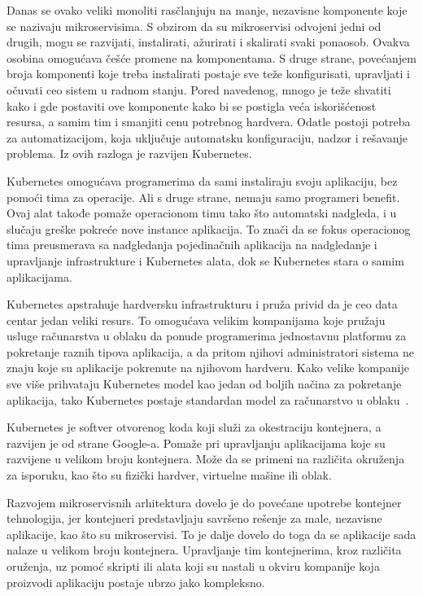 Danas se ovako veliki monoliti rasčlanjuju na manje, nezavisne komponente koje se nazivaju mikroservisima. S obzirom
da su mikroservisi odvojeni jedni od drugih, mogu se razvijati, instalirati, ažurirati i skalirati svaki ponaosob.
Ovakva osobina omogućava češće promene na komponentama. S druge strane, povećanjem broja komponenti koje treba 
instalirati postaje sve teže konfigurisati, upravljati i očuvati ceo sistem u radnom stanju. Pored navedenog, mnogo 
je teže shvatiti kako i gde postaviti ove komponente kako bi se postigla veća iskorišćenost resursa, a samim tim i 
smanjiti cenu potrebnog hardvera. Odatle postoji potreba za automatizacijom, koja uključuje automatsku konfiguraciju,
nadzor  i rešavanje problema. Iz ovih razloga je razvijen Kubernetes.

Kubernetes omogućava programerima da sami instaliraju svoju aplikaciju, bez pomoći tima za operacije. Ali s druge 
strane, nemaju samo programeri benefit. Ovaj alat takođe pomaže operacionom timu tako što automatski nadgleda, 
i u slučaju greške pokreće nove instance aplikacija. To znači da se fokus operacionog tima preusmerava sa nadgledanja
pojedinačnih aplikacija na nadgledanje i upravljanje infrastrukture i Kubernetes alata, dok se Kubernetes stara o samim
aplikacijama.

Kubernetes apstrahuje hardversku infrastrukturu i pruža privid da je ceo data centar jedan veliki resurs. To omogućava
velikim kompanijama koje pružaju usluge računarstva u oblaku da ponude programerima jednostavnu platformu za pokretanje
raznih tipova aplikacija, a da pritom njihovi administratori sistema ne znaju koje su aplikacije pokrenute na njihovom
hardveru. Kako velike kompanije sve više prihvataju Kubernetes model kao jedan od boljih načina za pokretanje aplikacija,
tako Kubernetes postaje standardan model za računarstvo u oblaku~\cite{KIA}.

Kubernetes je softver otvorenog koda koji služi za okestraciju kontejnera, a razvijen je od 
strane Google-a. Pomaže pri upravljanju aplikacijama koje su razvijene u velikom broju 
kontejnera. Može da se primeni na različita okruženja za isporuku, kao što su fizički 
hardver, virtuelne mašine ili oblak.

Razvojem mikroservisnih arhitektura dovelo je do povećane upotrebe kontejner tehnologija, jer 
kontejneri predstavljaju savršeno rešenje za male, nezavisne aplikacije, kao što su mikroservisi. 
To je dalje dovelo do toga da se aplikacije sada nalaze u velikom broju kontejnera. Upravljanje 
tim kontejnerima, kroz različita oruženja, uz pomoć skripti ili alata koji su nastali u okviru 
kompanije koja proizvodi aplikaciju postaje ubrzo jako kompleksno.

